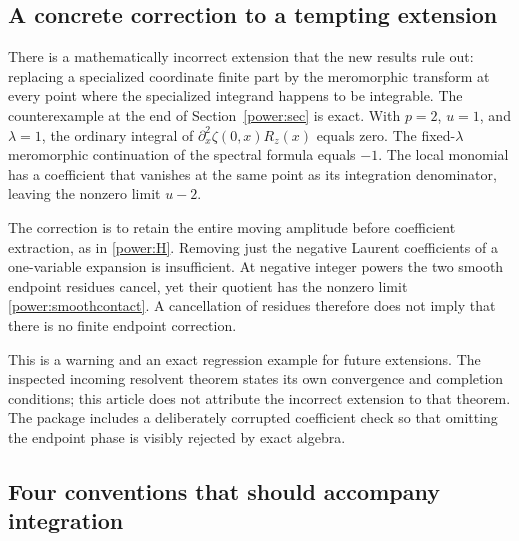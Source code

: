 \documentclass[11pt,a4paper]{article}
\numberwithin{equation}{section}
\theoremstyle{definition}
\theoremstyle{remark}
\begin{document}
\subsection{A concrete correction to a tempting extension}

There is a mathematically incorrect extension that the new results
rule out: replacing a specialized coordinate finite part by the
meromorphic transform at every point where the specialized integrand
happens to be integrable. The counterexample at the end of
Section~\ref{power:sec} is exact. With $p=2$, $u=1$, and
$\lambda=1$, the ordinary integral of
$\partial_x^2\zeta(0,x)R_z(x)$ equals zero. The fixed-$\lambda$
meromorphic continuation of the spectral formula equals $-1$.
The local monomial has a coefficient that vanishes at the same
point as its integration denominator, leaving the nonzero limit
$u-2$.

The correction is to retain the entire moving amplitude before
coefficient extraction, as in \eqref{power:H}. Removing just the
negative Laurent coefficients of a one-variable expansion is
insufficient. At negative integer powers the two smooth endpoint
residues cancel, yet their quotient has the nonzero limit
\eqref{power:smoothcontact}. A cancellation of residues therefore
does not imply that there is no finite endpoint correction.

This is a warning and an exact regression example for future
extensions. The inspected incoming resolvent theorem states its
own convergence and completion conditions; this article does not
attribute the incorrect extension to that theorem. The package
includes a deliberately corrupted coefficient check so that
omitting the endpoint phase is visibly rejected by exact algebra.

\subsection{Four conventions that should accompany integration}
\end{document}
